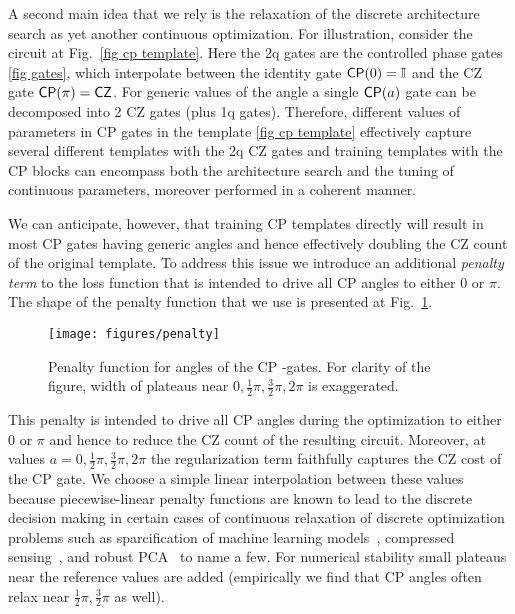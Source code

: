 \documentclass[draft, twocolumn, amsfonts, amssymb, aps, nofootinbib]{revtex4-2}
\newcommand{\CZ}{\textsf{CZ }}
\newcommand{\CP}{\textsf{CP }}
\begin{document}
A second main idea that we rely is the relaxation of the discrete architecture search as yet another continuous optimization. For illustration, consider the circuit at Fig.~\ref{fig cp template}. Here the 2q gates are the controlled phase gates \eqref{fig gates}, which interpolate between the identity gate $\text{\textsf{CP}}(0)=\mathbb{I}$ and the \CZ gate $\text{\textsf{CP}}(\pi)=\text{\textsf{CZ}}$. For generic values of the angle a single $\text{\textsf{CP}}(a)$ gate can be decomposed into 2 \CZ gates (plus 1q gates). Therefore, different values of parameters in \CP gates in the template \eqref{fig cp template} effectively capture several different templates with the 2q \CZ gates and training templates with the \CP blocks can encompass both the architecture search and the tuning of continuous parameters, moreover performed in a coherent manner.

We can anticipate, however, that training \CP templates directly will result in most \CP gates having generic angles and hence effectively doubling the \CZ count of the original template. To address this issue we introduce an additional \textit{penalty term} to the loss function that is intended to drive all \CP angles to either $0$ or $\pi$. The shape of the penalty function that we use is presented at Fig.~\ref{fig penalty}.

\begin{figure}[h]
	\texttt{[image: figures/penalty]}
	\caption{Penalty function for angles of the \CP-gates. For clarity of the figure, width of plateaus near $0,\frac12\pi, \frac32\pi, 2\pi$ is exaggerated.}
	\label{fig penalty}
\end{figure}

This penalty is intended to drive all \CP angles during the optimization to either $0$ or $\pi$ and hence to reduce the \CZ count of the resulting circuit. Moreover, at values $a=0,\frac12\pi, \frac32\pi, 2\pi$ the regularization term faithfully captures the \CZ cost of the \CP gate. We choose a simple linear interpolation between these values because piecewise-linear penalty functions are known to lead to the discrete decision making in certain cases of continuous relaxation of discrete optimization problems such as sparcification of machine learning models~\cite{tibshirani1996regression}, compressed sensing~\cite{donoho2006most, candes2006robust}, and robust PCA~\cite{candes2011robust} to name a few. For numerical stability small plateaus near the reference values are added (empirically we find that \CP angles often relax near $\frac12\pi, \frac32\pi$ as well).
\end{document}
